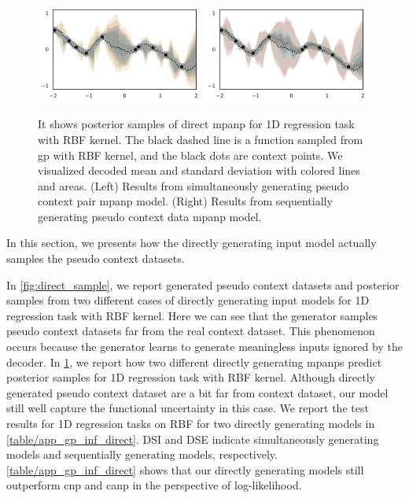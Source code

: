 \begin{figure}[t]
    \centering
    \includegraphics[width = 0.49\textwidth]{figure/direct2.pdf}
    \includegraphics[width = 0.49\textwidth]{figure/direct8.pdf}
    \caption{It shows posterior samples of direct \gls{mpanp} for 1D regression task with RBF kernel. The black dashed line is a function sampled from \gls{gp} with RBF kernel, and the black dots are context points. We visualized decoded mean and standard deviation with colored lines and areas. (Left) Results from simultaneously generating pseudo context pair \gls{mpanp} model. (Right) Results from sequentially generating pseudo context data \gls{mpanp} model.}
    \label{fig:direct_decode}
\end{figure}

In this section, we presents how the directly generating input model actually samples the pseudo context datasets. 

In \cref{fig:direct_sample}, we report generated pseudo context datasets and posterior samples from two different cases of directly generating input models for 1D regression task with RBF kernel. Here we can see that the generator samples pseudo context datasets far from the real context dataset. This phenomenon occurs because the generator learns to generate meaningless inputs ignored by the decoder.
In \cref{fig:direct_decode}, we report how two different directly generating \glspl{mpanp} predict posterior samples for 1D regression task with RBF kernel. 
Although directly generated pseudo context dataset are a bit far from context dataset, our model still well capture the functional uncertainty in this case.
We report the test results for 1D regression tasks on RBF for two directly generating models in \cref{table/app_gp_inf_direct}.
DSI and DSE indicate simultaneously generating models and sequentially generating models, respectively.
\cref{table/app_gp_inf_direct} shows that our directly generating models still outperform \gls{cnp} and \gls{canp} in the perspective of log-likelihood.

